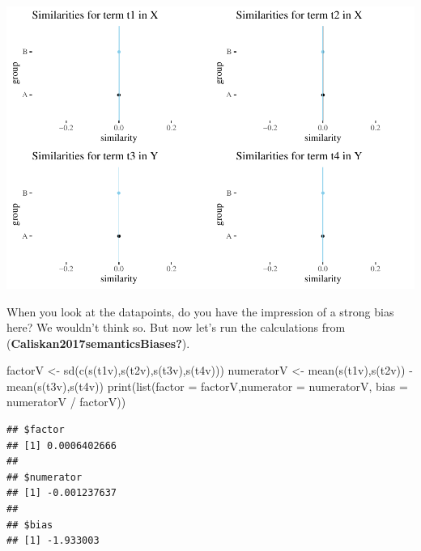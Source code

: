 \documentclass[
  10pt,
  dvipsnames,enabledeprecatedfontcommands]{scrartcl}
\newenvironment{Shaded}{\begin{snugshade}}{\end{snugshade}}
\newcommand{\AttributeTok}[1]{\textcolor[rgb]{0.77,0.63,0.00}{#1}}
\newcommand{\FunctionTok}[1]{\textcolor[rgb]{0.00,0.00,0.00}{#1}}
\newcommand{\NormalTok}[1]{#1}
\newcommand{\OtherTok}[1]{\textcolor[rgb]{0.56,0.35,0.01}{#1}}
\newcommand{\SpecialCharTok}[1]{\textcolor[rgb]{0.00,0.00,0.00}{#1}}
\begin{document}
\normalsize

\begin{center}\includegraphics[width=1\linewidth]{paperDraft_files/figure-latex/unnamed-chunk-6-1} \end{center}

\noindent When you look at the datapoints, do you have the impression of
a strong bias here? We wouldn't think so. But now let's run the
calculations from (\textbf{Caliskan2017semanticsBiases?}).

\vspace{1mm}
\footnotesize

\begin{Shaded}
\begin{Highlighting}[]
\NormalTok{factorV }\OtherTok{\textless{}{-}} \FunctionTok{sd}\NormalTok{(}\FunctionTok{c}\NormalTok{(}\FunctionTok{s}\NormalTok{(t1v),}\FunctionTok{s}\NormalTok{(t2v),}\FunctionTok{s}\NormalTok{(t3v),}\FunctionTok{s}\NormalTok{(t4v)))}
\NormalTok{numeratorV }\OtherTok{\textless{}{-}}  \FunctionTok{mean}\NormalTok{(}\FunctionTok{s}\NormalTok{(t1v),}\FunctionTok{s}\NormalTok{(t2v)) }\SpecialCharTok{{-}} \FunctionTok{mean}\NormalTok{(}\FunctionTok{s}\NormalTok{(t3v),}\FunctionTok{s}\NormalTok{(t4v))}
\FunctionTok{print}\NormalTok{(}\FunctionTok{list}\NormalTok{(}\AttributeTok{factor =}\NormalTok{ factorV,}\AttributeTok{numerator =}\NormalTok{ numeratorV, }\AttributeTok{bias =}\NormalTok{ numeratorV }\SpecialCharTok{/}\NormalTok{ factorV))}
\end{Highlighting}
\end{Shaded}

\begin{verbatim}
## $factor
## [1] 0.0006402666
## 
## $numerator
## [1] -0.001237637
## 
## $bias
## [1] -1.933003
\end{verbatim}
\end{document}
